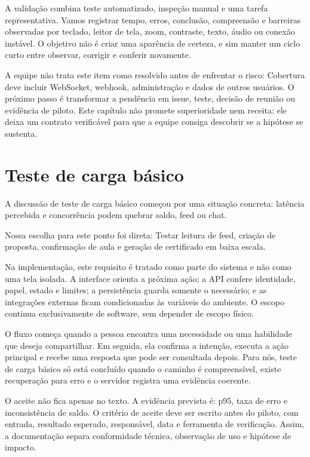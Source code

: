 \documentclass[12pt,oneside,a4paper,article]{abntex2}
\begin{document}
A validação combina teste automatizado, inspeção manual e uma tarefa representativa. Vamos registrar tempo, erros, conclusão, compreensão e barreiras observadas por teclado, leitor de tela, zoom, contraste, texto, áudio ou conexão instável. O objetivo não é criar uma aparência de certeza, e sim manter um ciclo curto entre observar, corrigir e conferir novamente.

A equipe não trata este item como resolvido antes de enfrentar o risco: Cobertura deve incluir WebSocket, webhook, administração e dados de outros usuários. O próximo passo é transformar a pendência em issue, teste, decisão de reunião ou evidência de piloto. Este capítulo não promete superioridade nem receita: ele deixa um contrato verificável para que a equipe consiga descobrir se a hipótese se sustenta.

\section{Teste de carga básico}
A discussão de teste de carga básico começou por uma situação concreta: latência percebida e concorrência podem quebrar saldo, feed ou chat.

Nossa escolha para este ponto foi direta: Testar leitura de feed, criação de proposta, confirmação de aula e geração de certificado em baixa escala.

Na implementação, este requisito é tratado como parte do sistema e não como uma tela isolada. A interface orienta a próxima ação; a API confere identidade, papel, estado e limites; a persistência guarda somente o necessário; e as integrações externas ficam condicionadas às variáveis do ambiente. O escopo continua exclusivamente de software, sem depender de escopo físico.

O fluxo começa quando a pessoa encontra uma necessidade ou uma habilidade que deseja compartilhar. Em seguida, ela confirma a intenção, executa a ação principal e recebe uma resposta que pode ser consultada depois. Para nós, teste de carga básico só está concluído quando o caminho é compreensível, existe recuperação para erro e o servidor registra uma evidência coerente.

O aceite não fica apenas no texto. A evidência prevista é: p95, taxa de erro e inconsistência de saldo. O critério de aceite deve ser escrito antes do piloto, com entrada, resultado esperado, responsável, data e ferramenta de verificação. Assim, a documentação separa conformidade técnica, observação de uso e hipótese de impacto.
\end{document}

